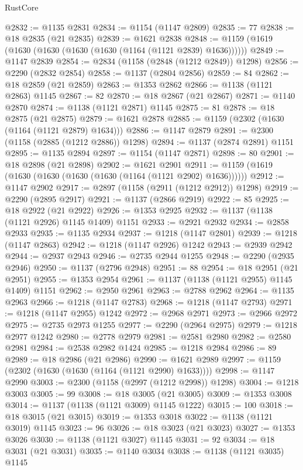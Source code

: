 \begin{lexlean}{RustCore}
\begin{coremodule}
@2832 := @1135 @2831
@2834 := @1154 (@1147 @2809)
@2835 := 77
@2838 := @18 @2835 (@21 @2835)
@2839 := @1621 @2838
@2848 := @1159 (@1619 (@1630 (@1630 (@1630 (@1630 (@1164 (@1121 @2839) @1636))))))
@2849 := @1147 @2839
@2854 := @2834 (@1158 (@2848 (@1212 @2849)) @1298)
@2856 := @2290 (@2832 @2854)
@2858 := @1137 (@2804 @2856)
@2859 := 84
@2862 := @18 @2859 (@21 @2859)
@2863 := @1353 @2862
@2866 := @1138 (@1121 @2863) @1145
@2867 := 82
@2870 := @18 @2867 (@21 @2867)
@2871 := @1140 @2870
@2874 := @1138 (@1121 @2871) @1145
@2875 := 81
@2878 := @18 @2875 (@21 @2875)
@2879 := @1621 @2878
@2885 := @1159 (@2302 (@1630 (@1164 (@1121 @2879) @1634)))
@2886 := @1147 @2879
@2891 := @2300 (@1158 (@2885 (@1212 @2886)) @1298)
@2894 := @1137 (@2874 @2891) @1151
@2895 := @1135 @2894
@2897 := @1154 (@1147 @2871)
@2898 := 80
@2901 := @18 @2898 (@21 @2898)
@2902 := @1621 @2901
@2911 := @1159 (@1619 (@1630 (@1630 (@1630 (@1630 (@1164 (@1121 @2902) @1636))))))
@2912 := @1147 @2902
@2917 := @2897 (@1158 (@2911 (@1212 @2912)) @1298)
@2919 := @2290 (@2895 @2917)
@2921 := @1137 (@2866 @2919)
@2922 := 85
@2925 := @18 @2922 (@21 @2922)
@2926 := @1353 @2925
@2932 := @1137 (@1138 (@1121 @2926) @1145 @1409) @1151
@2933 := @2921 @2932
@2934 := @2858 @2933
@2935 := @1135 @2934
@2937 := @1218 (@1147 @2801)
@2939 := @1218 (@1147 @2863)
@2942 := @1218 (@1147 @2926) @1242
@2943 := @2939 @2942
@2944 := @2937 @2943
@2946 := @2735 @2944 @1255
@2948 := @2290 (@2935 @2946)
@2950 := @1137 (@2796 @2948)
@2951 := 88
@2954 := @18 @2951 (@21 @2951)
@2955 := @1353 @2954
@2961 := @1137 (@1138 (@1121 @2955) @1145 @1409) @1151
@2962 := @2950 @2961
@2963 := @2788 @2962
@2964 := @1135 @2963
@2966 := @1218 (@1147 @2783)
@2968 := @1218 (@1147 @2793)
@2971 := @1218 (@1147 @2955) @1242
@2972 := @2968 @2971
@2973 := @2966 @2972
@2975 := @2735 @2973 @1255
@2977 := @2290 (@2964 @2975)
@2979 := @1218 @2977 @1242
@2980 := @2778 @2979
@2981 := @2581 @2980
@2982 := @2580 @2981
@2984 := @2538 @2982 @1424
@2985 := @1218 @2984
@2986 := 89
@2989 := @18 @2986 (@21 @2986)
@2990 := @1621 @2989
@2997 := @1159 (@2302 (@1630 (@1630 (@1164 (@1121 @2990) @1633))))
@2998 := @1147 @2990
@3003 := @2300 (@1158 (@2997 (@1212 @2998)) @1298)
@3004 := @1218 @3003
@3005 := 99
@3008 := @18 @3005 (@21 @3005)
@3009 := @1353 @3008
@3014 := @1137 (@1138 (@1121 @3009) @1145 @1222)
@3015 := 100
@3018 := @18 @3015 (@21 @3015)
@3019 := @1353 @3018
@3022 := @1138 (@1121 @3019) @1145
@3023 := 96
@3026 := @18 @3023 (@21 @3023)
@3027 := @1353 @3026
@3030 := @1138 (@1121 @3027) @1145
@3031 := 92
@3034 := @18 @3031 (@21 @3031)
@3035 := @1140 @3034
@3038 := @1138 (@1121 @3035) @1145

\end{coremodule}
\end{lexlean}
